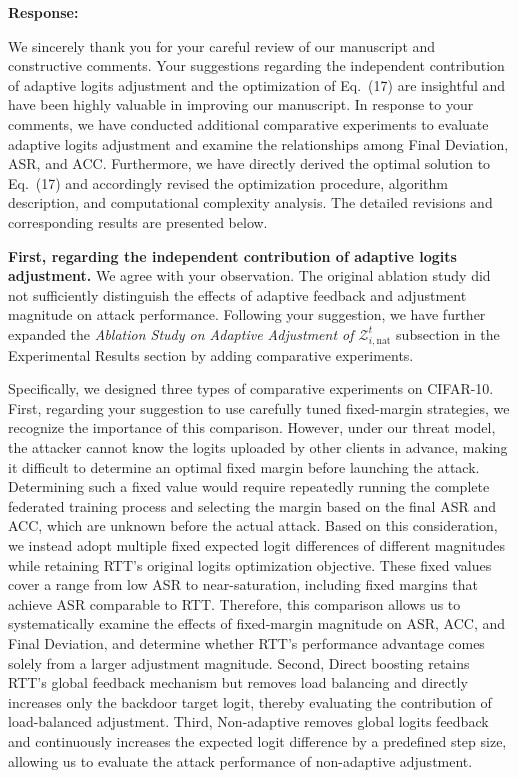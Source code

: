 \documentclass[11pt,a4paper]{article}
\newcommand{\manualindent}{\par\noindent\hspace*{1.5em}\ignorespaces}
\newcommand{\authorresponse}[1]{%
  {\bfseries\color{replyblue}Response:}\par
  #1\par\vspace{0.35em}%
}
\begin{document}
\authorresponse{\manualindent We sincerely thank you for your careful review of our manuscript and constructive comments.
Your suggestions regarding the independent contribution of adaptive logits adjustment and the optimization of Eq.~(17) are insightful and have been highly valuable in improving our manuscript.
In response to your comments, we have conducted additional comparative experiments to evaluate adaptive logits adjustment and examine the relationships among Final Deviation, ASR, and ACC.
Furthermore, we have directly derived the optimal solution to Eq.~(17) and accordingly revised the optimization procedure, algorithm description, and computational complexity analysis.
The detailed revisions and corresponding results are presented below.

\manualindent \textbf{First, regarding the independent contribution of adaptive logits adjustment.}
We agree with your observation.
The original ablation study did not sufficiently distinguish the effects of adaptive feedback and adjustment magnitude on attack performance.
Following your suggestion, we have further expanded the \textit{Ablation Study on Adaptive Adjustment of $\mathcal{Z}_{i,\mathrm{nat}}^t$} subsection in the Experimental Results section by adding comparative experiments.

\manualindent Specifically, we designed three types of comparative experiments on CIFAR-10.
First, regarding your suggestion to use carefully tuned fixed-margin strategies, we recognize the importance of this comparison.
However, under our threat model, the attacker cannot know the logits uploaded by other clients in advance, making it difficult to determine an optimal fixed margin before launching the attack.
Determining such a fixed value would require repeatedly running the complete federated training process and selecting the margin based on the final ASR and ACC, which are unknown before the actual attack.
Based on this consideration, we instead adopt multiple fixed expected logit differences of different magnitudes while retaining RTT's original logits optimization objective.
These fixed values cover a range from low ASR to near-saturation, including fixed margins that achieve ASR comparable to RTT.
Therefore, this comparison allows us to systematically examine the effects of fixed-margin magnitude on ASR, ACC, and Final Deviation, and determine whether RTT's performance advantage comes solely from a larger adjustment magnitude.
Second, Direct boosting retains RTT's global feedback mechanism but removes load balancing and directly increases only the backdoor target logit, thereby evaluating the contribution of load-balanced adjustment.
Third, Non-adaptive removes global logits feedback and continuously increases the expected logit difference by a predefined step size, allowing us to evaluate the attack performance of non-adaptive adjustment.

}
\end{document}
